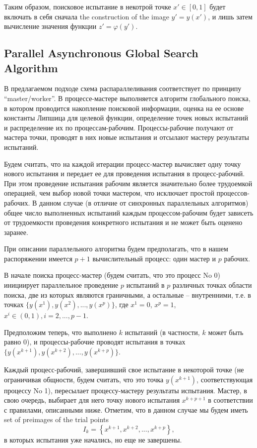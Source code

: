 \documentclass{svproc}
\begin{document}
Таким образом, поисковое испытание в некотрой точке $x'\in[0,1]$ будет включать в себя сначала the construction of the image $y'=y(x')$, и лишь затем вычисление значения функции $ z' = \varphi(y')$.

\subsection{Parallel Asynchronous Global Search Algorithm}

В предлагаемом подходе схема распараллеливания соответствует по принципу ``master/worker''. В процессе-мастере выполняется алгоритм глобального поиска, в котором проводится накопление поисковой информации, оценка на ее основе константы Липшица для целевой функции, определение точек новых испытаний и распределение их по процессам-рабочим. Процессы-рабочие получают от мастера точки, проводят в них новые испытания и отсылают мастеру результаты испытаний. 

Будем считать, что на каждой итерации процесс-мастер вычисляет одну точку нового испытания и передает ее для проведения испытания в процесс-рабочий. При этом проведение испытания рабочим является значительно более трудоемкой операцией, чем выбор новой точки мастером, что исключает простой процессов-рабочих. 
В данном случае (в отличие от синхронных параллельных алгоритмов) общее число выполненных испытаний каждым процессом-рабочим будет зависеть от трудоемкости проведения конкретного испытания и не может быть оценено заранее.

При описании параллельного алгоритма будем предполагать, что в нашем распоряжении имеется $p+1$ вычислительный процесс: один мастер и $p$ рабочих.
 
В начале поиска процесс-мастер (будем считать, что это процесс No 0) инициирует параллельное проведение $p$ испытаний в $p$ различных точках области поиска, две из которых являются граничными, а остальные -- внутренними, т.е. в точках $\{y(x^1), y(x^2), ...,y(x^p)\}$, где $x^1 = 0$, $x^p = 1$, $x^i\in(0,1), i=2,..., p-1$.

Предположим теперь, что выполнено $k$ испытаний (в частности, $k$ может быть равно 0), и процессы-рабочие проводят испытания в точках $\{y(x^{k+1}), y(x^{k+2}), ...,y(x^{k+p})\}$. 

Каждый процесс-рабочий, завершивший свое испытание в некоторой точке (не ограничивая общности, будем считать, что это точка $y(x^{k+1})$, соответствующая процессу No 1), пересылает процессу-мастеру результаты испытания. Мастер, в свою очередь, выбирает для него точку нового испытания $x^{k+p+1}$ в соответствии с правилами, описанными ниже.
Отметим, что в данном случае мы будем иметь set of preimages of the trial points
\[
I_k = \left\{ x^{k+1},x^{k+2},...,x^{k+p} \right\},
\]
в которых испытания уже начались, но еще не завершены.
\end{document}

